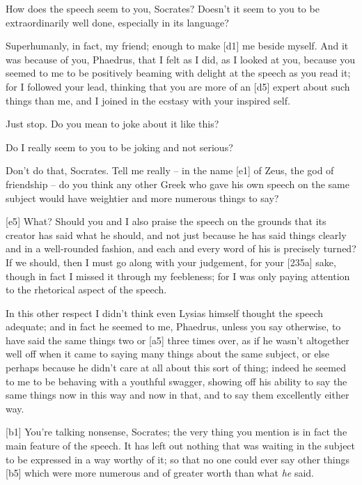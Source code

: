 How does the speech seem to you, Socrates? Doesn't it seem to you to be
extraordinarily well done, especially in its language?

 Superhumanly, in fact, my friend; enough to make {[}d1{]} me
beside myself. And it was because of you, Phaedrus, that I felt as I
did, as I looked at you, because you seemed to me to be positively
beaming with delight at the speech as you read it; for I followed your
lead, thinking that you are more of an {[}d5{]} expert about such things
than me, and I joined in the ecstasy with your
inspired self.

 Just stop. Do you mean to joke about it like this?

 Do I really seem to you to be joking and not serious?

 Don't do that, Socrates. Tell me really -- in the name {[}e1{]}
of Zeus, the god of friendship -- do you think any other Greek who gave
his own speech on the same subject would have weightier and more
numerous things to say?

{[}e5{]}  What? Should you and I also praise the speech on the
grounds that its creator
has said what he should, and not just because he has said things clearly
and in a well-rounded fashion, and each and every word of his is
precisely turned? If we should, then I must go along with your
judgement, for your {[}235a{]} sake, though in fact I missed
it through my feebleness;
for I was only paying attention to the rhetorical aspect of the speech.

In this other respect I didn't think even Lysias himself thought the
speech adequate; and in fact he seemed to me, Phaedrus, unless you say
otherwise, to have said the same things two or {[}a5{]} three times
over, as if he wasn't altogether well off when it came to saying many
things about the same subject, or else perhaps because he didn't care at
all about this sort of thing; indeed he seemed to me to be behaving with
a youthful swagger, showing off his ability to say the same things now
in this way and now in that, and to say them excellently either way.

{[}b1{]}  You're talking nonsense, Socrates; the very thing you
mention is in fact the main feature of the speech. It has left out
nothing that was waiting in the subject to be expressed in a way worthy
of it; so that no one could ever say other things {[}b5{]} which were
more numerous and of greater worth than what {\em he} said.

